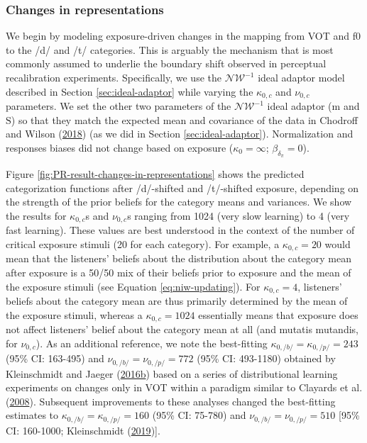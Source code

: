 \documentclass[
  11pt,
  man,floatsintext]{apa6}
\begin{document}
\hypertarget{changes-in-representations}{%
\subsubsection{Changes in representations}\label{changes-in-representations}}

We begin by modeling exposure-driven changes in the mapping from VOT and f0 to the /d/ and /t/ categories. This is arguably the mechanism that is most commonly assumed to underlie the boundary shift observed in perceptual recalibration experiments. Specifically, we use the \(\mathcal{NW}^{-1}\) ideal adaptor model described in Section \ref{sec:ideal-adaptor} while varying the \(\kappa_{0,c}\) and \(\nu_{0,c}\) parameters. We set the other two parameters of the \(\mathcal{NW}^{-1}\) ideal adaptor (\(\mathrm{m}\) and \(\mathrm{S}\)) so that they match the expected mean and covariance of the data in Chodroff and Wilson (\protect\hyperlink{ref-chodroff-wilson2018}{2018}) (as we did in Section \ref{sec:ideal-adaptor}). Normalization and responses biases did not change based on exposure (\(\kappa_0 = \infty\); \(\beta_{\delta_\pi}=0\)).

Figure \ref{fig:PR-result-changes-in-representations} shows the predicted categorization functions after /d/-shifted and /t/-shifted exposure, depending on the strength of the prior beliefs for the category means and variances. We show the results for \(\kappa_{0,c}\)s and \(\nu_{0,c}\)s ranging from 1024 (very slow learning) to 4 (very fast learning). These values are best understood in the context of the number of critical exposure stimuli (20 for each category). For example, a \(\kappa_{0,c}=20\) would mean that the listeners' beliefs about the distribution about the category mean after exposure is a 50/50 mix of their beliefs prior to exposure and the mean of the exposure stimuli (see Equation \eqref{eq:niw-updating}). For \(\kappa_{0,c}=4\), listeners' beliefs about the category mean are thus primarily determined by the mean of the exposure stimuli, whereas a \(\kappa_{0,c}=1024\) essentially means that exposure does not affect listeners' belief about the category mean at all (and mutatis mutandis, for \(\nu_{0,c}\)). As an additional reference, we note the best-fitting \(\kappa_{0,/b/}=\kappa_{0,/p/}=243\) (95\% CI: 163-495) and \(\nu_{0,/b/}=\nu_{0,/p/}=772\) (95\% CI: 493-1180) obtained by Kleinschmidt and Jaeger (\protect\hyperlink{ref-kleinschmidt-jaeger2016cogsci}{2016b}) based on a series of distributional learning experiments on changes only in VOT within a paradigm similar to Clayards et al. (\protect\hyperlink{ref-clayards2008}{2008}). Subsequent improvements to these analyses changed the best-fitting estimates to \(\kappa_{0,/b/}=\kappa_{0,/p/}=160\) (95\% CI: 75-780) and \(\nu_{0,/b/}=\nu_{0,/p/}=510\) {[}95\% CI: 160-1000; Kleinschmidt (\protect\hyperlink{ref-kleinschmidt2019}{2019}){]}.
\end{document}
